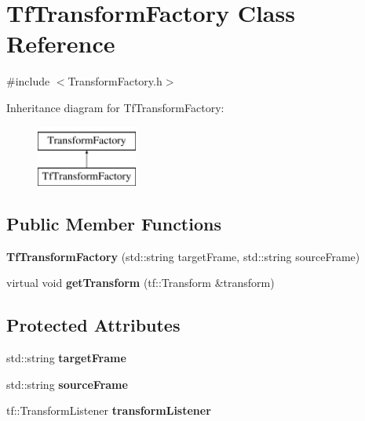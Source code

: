 \hypertarget{classTfTransformFactory}{\section{\-Tf\-Transform\-Factory \-Class \-Reference}
\label{classTfTransformFactory}
}


{\ttfamily \#include $<$\-Transform\-Factory.\-h$>$}

\-Inheritance diagram for \-Tf\-Transform\-Factory\-:\begin{figure}[H]
\begin{center}
\leavevmode
\includegraphics[height=2.000000cm]{classTfTransformFactory}
\end{center}
\end{figure}
\subsection*{\-Public \-Member \-Functions}
\begin{DoxyCompactItemize}
\item 
\hypertarget{classTfTransformFactory_a64ad5f97558fff2a1ac9fc9f6a1e7195}{{\bfseries \-Tf\-Transform\-Factory} (std\-::string target\-Frame, std\-::string source\-Frame)}\label{classTfTransformFactory_a64ad5f97558fff2a1ac9fc9f6a1e7195}

\item 
\hypertarget{classTfTransformFactory_afbf08c88d042160b83fe6b5ad3592ac2}{virtual void {\bfseries get\-Transform} (tf\-::\-Transform \&transform)}\label{classTfTransformFactory_afbf08c88d042160b83fe6b5ad3592ac2}

\end{DoxyCompactItemize}
\subsection*{\-Protected \-Attributes}
\begin{DoxyCompactItemize}
\item 
\hypertarget{classTfTransformFactory_afa2716e228add9788cc3063f40632cc9}{std\-::string {\bfseries target\-Frame}}\label{classTfTransformFactory_afa2716e228add9788cc3063f40632cc9}

\item 
\hypertarget{classTfTransformFactory_a1d39f491b56155e0e02b1a90f47c8879}{std\-::string {\bfseries source\-Frame}}\label{classTfTransformFactory_a1d39f491b56155e0e02b1a90f47c8879}

\item 
\hypertarget{classTfTransformFactory_a39f386acdb290de27c686ce08072c974}{tf\-::\-Transform\-Listener {\bfseries transform\-Listener}}\label{classTfTransformFactory_a39f386acdb290de27c686ce08072c974}

\end{DoxyCompactItemize}


